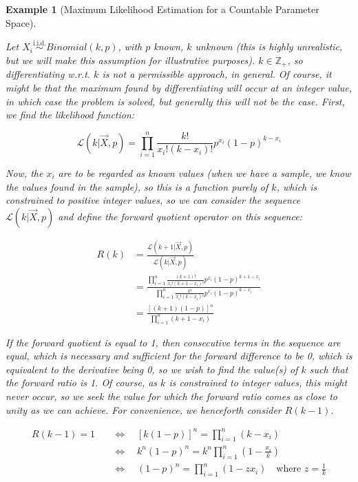 \documentclass[12pt,a4paper]{article}
\newtheorem{ex}[thm]{Example}
\begin{document}
\begin{ex}[Maximum Likelihood Estimation for a Countable Parameter Space]$\;$\par\vspace{1cm}

Let $X_i \overset{\text{i.i.d.}}{\sim} Binomial(k,p)$, with $p$ known, $k$ unknown (this is highly unrealistic, but we will make this assumption for illustrative purposes). $k \in \mathbb{Z}_+$, so differentiating w.r.t. $k$ is not a permissible approach, in general. Of course, it might be that the maximum found by differentiating will occur at an integer value, in which case the problem is solved, but generally this will not be the case. First, we find the likelihood function:

$$\mathcal{L}(k | \vec{X},p) = \prod_{i=1}^n \frac{k!}{x_i! (k - x_i)!} p^{x_i} (1-p)^{k-x_i}$$

Now, the $x_i$ are to be regarded as known values (when we have a sample, we know the values found in the sample), so this is a function purely of $k$, which is constrained to positive integer values, so we can consider the sequence $\mathcal{L}(k | \vec{X},p)$ and define the forward quotient operator on this sequence:

\begin{align*}
R(k) &= \frac{\mathcal{L}(k+1 | \vec{X},p)}{\mathcal{L}(k | \vec{X},p)}\\
&= \frac{\prod\limits_{i=1}^n \frac{(k+1)!}{x_i! (k+1-x_i)!} p^{x_i} (1-p)^{k+1-x_i}}{\prod\limits_{i=1}^n \frac{k!}{x_i!(k-x_i)!} p^{x_i}(1-p)^{k-x_i}}\\
&= \frac{[(k+1)(1-p)]^n}{\prod\limits_{i=1}^n (k+1-x_i)}
\end{align*}

If the forward quotient is equal to 1, then consecutive terms in the sequence are equal, which is necessary and sufficient for the forward difference to be 0, which is equivalent to the derivative being 0, so we wish to find the value(s) of $k$ such that the forward ratio is 1. Of course, as $k$ is constrained to integer values, this might never occur, so we seek the value for which the forward ratio comes as close to unity as we can achieve. For convenience, we henceforth consider $R(k-1)$.

\begin{align*}
R(k-1) = 1 \quad&\Leftrightarrow\quad [k(1-p)]^n = \prod_{i=1}^n (k-x_i)\\
&\Leftrightarrow\quad k^n(1-p)^n = k^n \prod_{i=1}^n \left(1 - \frac{x_i}{k}\right)\\
&\Leftrightarrow\quad (1-p)^n = \prod_{i=1}^n (1-zx_i)\quad \textrm{where } z = \frac{1}{k}
\end{align*}


\end{ex}
\end{document}
